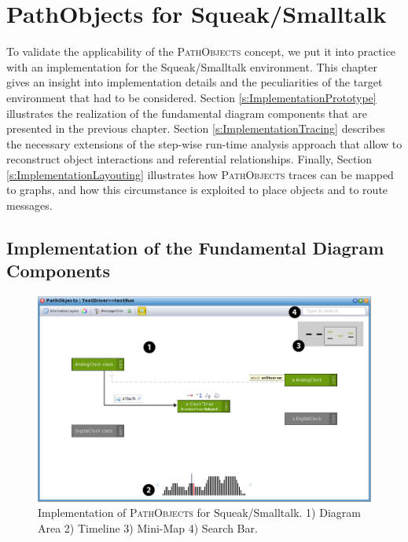 \chapter{PathObjects for Squeak/Smalltalk}
\label{c:implementation}
To validate the applicability of the \textsc{PathObjects} concept, we put it into practice with an implementation for the Squeak/Smalltalk environment.
This chapter gives an insight into implementation details and the peculiarities of the target environment that had to be considered.
Section \ref{s:ImplementationPrototype} illustrates the realization of the fundamental diagram components that are presented in the previous chapter.
Section \ref{s:ImplementationTracing} describes the necessary extensions of the step-wise run-time analysis approach that allow to reconstruct object interactions and referential relationships.
Finally, Section \ref{s:ImplementationLayouting} illustrates how \textsc{PathObjects} traces can be mapped to graphs, and how this circumstance is exploited to place objects and to route messages.

\section[Implementation of the Fundamental Diagram Components]{Implementation of the Fundamental Diagram Components%
}
\label{s:ImplementationPrototype}

\begin{figure}[tb]
	\centering
	\includegraphics[width=1\textwidth]{../images/04-ImplMainWindow}
	\caption[PathObjects for Squeak/Smalltalk]{Implementation of \textsc{PathObjects} for Squeak/Smalltalk. 1) Diagram Area 2) Timeline 3) Mini-Map 4) Search Bar.}
	\label{fig:ImplementationMainWindow}
\end{figure}


